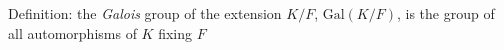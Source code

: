 \documentclass[preview]{standalone}
\begin{document}
\begin{center}
Definition: the \textit{Galois} group of the extension $K/F$, $\text{Gal}(K/F)$, is the group of all automorphisms of $K$ fixing $F$
\end{center}
\end{document}
